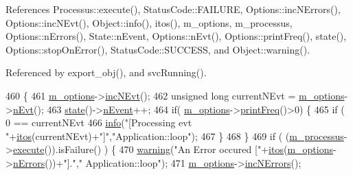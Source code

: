 References Processus\+::execute(), Status\+Code\+::\+F\+A\+I\+L\+U\+RE, Options\+::inc\+N\+Errors(), Options\+::inc\+N\+Evt(), Object\+::info(), itos(), m\+\_\+options, m\+\_\+processus, Options\+::n\+Errors(), State\+::n\+Event, Options\+::n\+Evt(), Options\+::print\+Freq(), state(), Options\+::stop\+On\+Error(), Status\+Code\+::\+S\+U\+C\+C\+E\+SS, and Object\+::warning().



Referenced by export\+\_\+obj(), and svc\+Running().


\begin{DoxyCode}
460                                \{
461   \hyperlink{classApplication_a3b0c74bf1ba99a5042990e3fefaa8963}{m\_options}->\hyperlink{classOptions_aa950f9861182c76c4005668e0b7f012a}{incNEvt}();
462   \textcolor{keywordtype}{unsigned} \textcolor{keywordtype}{long} currentNEvt = \hyperlink{classApplication_a3b0c74bf1ba99a5042990e3fefaa8963}{m\_options}->\hyperlink{classOptions_ad769b256263a4ac24dd6f989ae724ab7}{nEvt}();
463   \hyperlink{classApplication_adfc9b92559f61c92224abf03f51cef47}{state}()->\hyperlink{classState_af9d335bba28d6946043a07b047556690}{nEvent}++;
464   \textcolor{keywordflow}{if}( \hyperlink{classApplication_a3b0c74bf1ba99a5042990e3fefaa8963}{m\_options}->\hyperlink{classOptions_a67021ffef9f666bba4696f89807b2a70}{printFreq}()>0) \{
465     \textcolor{keywordflow}{if} ( 0 == currentNEvt %
466       \hyperlink{classObject_a644fd329ea4cb85f54fa6846484b84a8}{info}(\textcolor{stringliteral}{"[Processing evt "}+\hyperlink{Tools_8h_af330027dbdafb9a30768b3613c553e60}{itos}(currentNEvt)+\textcolor{stringliteral}{"]"},\textcolor{stringliteral}{"Application::loop"});
467     \}
468   \}
469   \textcolor{keywordflow}{if} ( (\hyperlink{classApplication_ab5eb4b3d3bef5ab9fce9c69401ce5786}{m\_processus}->\hyperlink{classProcessus_a63767a63a1fb0055c5aa45b21a4a5d58}{execute}()).isFailure() ) \{
470     \hyperlink{classObject_a65cd4fda577711660821fd2cd5a3b4c9}{warning}(\textcolor{stringliteral}{"An Error occured ["}+\hyperlink{Tools_8h_af330027dbdafb9a30768b3613c553e60}{itos}(\hyperlink{classApplication_a3b0c74bf1ba99a5042990e3fefaa8963}{m\_options}->\hyperlink{classOptions_acc6474323f0bbe17fa844e9a086b90b8}{nErrors}())+\textcolor{stringliteral}{"]."},\textcolor{stringliteral}{"
      Application::loop"});
471     \hyperlink{classApplication_a3b0c74bf1ba99a5042990e3fefaa8963}{m\_options}->\hyperlink{classOptions_ae5d12fb2571255033ef6b35300921b39}{incNErrors}();

\end{DoxyCode}
